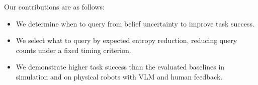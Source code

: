 Our contributions are as follows:
\begin{itemize}
\item We determine when to query from belief uncertainty to improve task success.
\item We select what to query by expected entropy reduction, reducing query counts under a fixed timing criterion.
\item We demonstrate higher task success than the evaluated baselines in simulation and on physical robots with VLM and human feedback.
\end{itemize}